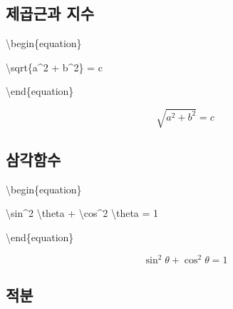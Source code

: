 \documentclass[
  letterpaper,
]{book}
\newenvironment{Shaded}{\begin{snugshade}}{\end{snugshade}}
\newcommand{\ExtensionTok}[1]{\textcolor[rgb]{0.00,0.23,0.31}{#1}}
\newcommand{\KeywordTok}[1]{\textcolor[rgb]{0.00,0.23,0.31}{#1}}
\newcommand{\NormalTok}[1]{\textcolor[rgb]{0.00,0.23,0.31}{#1}}
\newcommand{\SpecialCharTok}[1]{\textcolor[rgb]{0.37,0.37,0.37}{#1}}
\newcommand{\SpecialStringTok}[1]{\textcolor[rgb]{0.13,0.47,0.30}{#1}}
\begin{document}
\hypertarget{uxc81cuxacf1uxadfcuxacfc-uxc9c0uxc218}{%
\subsection{제곱근과 지수}\label{uxc81cuxacf1uxadfcuxacfc-uxc9c0uxc218}}

\begin{Shaded}
\begin{Highlighting}[]
\KeywordTok{\textbackslash{}begin}\NormalTok{\{}\ExtensionTok{equation}\NormalTok{\}}

\SpecialCharTok{\textbackslash{}sqrt}\SpecialStringTok{\{a\^{}2 + b\^{}2\} = c}

\KeywordTok{\textbackslash{}end}\NormalTok{\{}\ExtensionTok{equation}\NormalTok{\}}
\end{Highlighting}
\end{Shaded}

\begin{equation}

\sqrt{a^2 + b^2} = c

\end{equation}

\hypertarget{uxc0bcuxac01uxd568uxc218}{%
\subsection{삼각함수}\label{uxc0bcuxac01uxd568uxc218}}

\begin{Shaded}
\begin{Highlighting}[]
\KeywordTok{\textbackslash{}begin}\NormalTok{\{}\ExtensionTok{equation}\NormalTok{\}}

\SpecialCharTok{\textbackslash{}sin}\SpecialStringTok{\^{}2 }\SpecialCharTok{\textbackslash{}theta}\SpecialStringTok{ + }\SpecialCharTok{\textbackslash{}cos}\SpecialStringTok{\^{}2 }\SpecialCharTok{\textbackslash{}theta}\SpecialStringTok{ = 1}

\KeywordTok{\textbackslash{}end}\NormalTok{\{}\ExtensionTok{equation}\NormalTok{\}}
\end{Highlighting}
\end{Shaded}

\begin{equation}

\sin^2 \theta + \cos^2 \theta = 1

\end{equation}

\hypertarget{uxc801uxbd84}{%
\subsection{적분}\label{uxc801uxbd84}}
\end{document}
